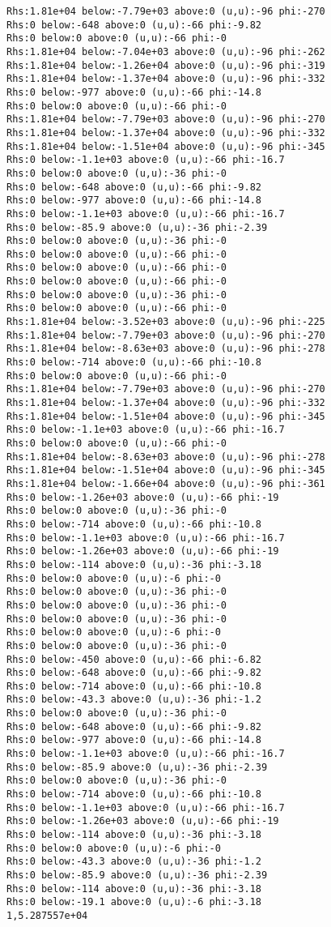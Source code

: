 \begin{verbatim}
Rhs:1.81e+04 below:-7.79e+03 above:0 (u,u):-96 phi:-270
Rhs:0 below:-648 above:0 (u,u):-66 phi:-9.82
Rhs:0 below:0 above:0 (u,u):-66 phi:-0
Rhs:1.81e+04 below:-7.04e+03 above:0 (u,u):-96 phi:-262
Rhs:1.81e+04 below:-1.26e+04 above:0 (u,u):-96 phi:-319
Rhs:1.81e+04 below:-1.37e+04 above:0 (u,u):-96 phi:-332
Rhs:0 below:-977 above:0 (u,u):-66 phi:-14.8
Rhs:0 below:0 above:0 (u,u):-66 phi:-0
Rhs:1.81e+04 below:-7.79e+03 above:0 (u,u):-96 phi:-270
Rhs:1.81e+04 below:-1.37e+04 above:0 (u,u):-96 phi:-332
Rhs:1.81e+04 below:-1.51e+04 above:0 (u,u):-96 phi:-345
Rhs:0 below:-1.1e+03 above:0 (u,u):-66 phi:-16.7
Rhs:0 below:0 above:0 (u,u):-36 phi:-0
Rhs:0 below:-648 above:0 (u,u):-66 phi:-9.82
Rhs:0 below:-977 above:0 (u,u):-66 phi:-14.8
Rhs:0 below:-1.1e+03 above:0 (u,u):-66 phi:-16.7
Rhs:0 below:-85.9 above:0 (u,u):-36 phi:-2.39
Rhs:0 below:0 above:0 (u,u):-36 phi:-0
Rhs:0 below:0 above:0 (u,u):-66 phi:-0
Rhs:0 below:0 above:0 (u,u):-66 phi:-0
Rhs:0 below:0 above:0 (u,u):-66 phi:-0
Rhs:0 below:0 above:0 (u,u):-36 phi:-0
Rhs:0 below:0 above:0 (u,u):-66 phi:-0
Rhs:1.81e+04 below:-3.52e+03 above:0 (u,u):-96 phi:-225
Rhs:1.81e+04 below:-7.79e+03 above:0 (u,u):-96 phi:-270
Rhs:1.81e+04 below:-8.63e+03 above:0 (u,u):-96 phi:-278
Rhs:0 below:-714 above:0 (u,u):-66 phi:-10.8
Rhs:0 below:0 above:0 (u,u):-66 phi:-0
Rhs:1.81e+04 below:-7.79e+03 above:0 (u,u):-96 phi:-270
Rhs:1.81e+04 below:-1.37e+04 above:0 (u,u):-96 phi:-332
Rhs:1.81e+04 below:-1.51e+04 above:0 (u,u):-96 phi:-345
Rhs:0 below:-1.1e+03 above:0 (u,u):-66 phi:-16.7
Rhs:0 below:0 above:0 (u,u):-66 phi:-0
Rhs:1.81e+04 below:-8.63e+03 above:0 (u,u):-96 phi:-278
Rhs:1.81e+04 below:-1.51e+04 above:0 (u,u):-96 phi:-345
Rhs:1.81e+04 below:-1.66e+04 above:0 (u,u):-96 phi:-361
Rhs:0 below:-1.26e+03 above:0 (u,u):-66 phi:-19
Rhs:0 below:0 above:0 (u,u):-36 phi:-0
Rhs:0 below:-714 above:0 (u,u):-66 phi:-10.8
Rhs:0 below:-1.1e+03 above:0 (u,u):-66 phi:-16.7
Rhs:0 below:-1.26e+03 above:0 (u,u):-66 phi:-19
Rhs:0 below:-114 above:0 (u,u):-36 phi:-3.18
Rhs:0 below:0 above:0 (u,u):-6 phi:-0
Rhs:0 below:0 above:0 (u,u):-36 phi:-0
Rhs:0 below:0 above:0 (u,u):-36 phi:-0
Rhs:0 below:0 above:0 (u,u):-36 phi:-0
Rhs:0 below:0 above:0 (u,u):-6 phi:-0
Rhs:0 below:0 above:0 (u,u):-36 phi:-0
Rhs:0 below:-450 above:0 (u,u):-66 phi:-6.82
Rhs:0 below:-648 above:0 (u,u):-66 phi:-9.82
Rhs:0 below:-714 above:0 (u,u):-66 phi:-10.8
Rhs:0 below:-43.3 above:0 (u,u):-36 phi:-1.2
Rhs:0 below:0 above:0 (u,u):-36 phi:-0
Rhs:0 below:-648 above:0 (u,u):-66 phi:-9.82
Rhs:0 below:-977 above:0 (u,u):-66 phi:-14.8
Rhs:0 below:-1.1e+03 above:0 (u,u):-66 phi:-16.7
Rhs:0 below:-85.9 above:0 (u,u):-36 phi:-2.39
Rhs:0 below:0 above:0 (u,u):-36 phi:-0
Rhs:0 below:-714 above:0 (u,u):-66 phi:-10.8
Rhs:0 below:-1.1e+03 above:0 (u,u):-66 phi:-16.7
Rhs:0 below:-1.26e+03 above:0 (u,u):-66 phi:-19
Rhs:0 below:-114 above:0 (u,u):-36 phi:-3.18
Rhs:0 below:0 above:0 (u,u):-6 phi:-0
Rhs:0 below:-43.3 above:0 (u,u):-36 phi:-1.2
Rhs:0 below:-85.9 above:0 (u,u):-36 phi:-2.39
Rhs:0 below:-114 above:0 (u,u):-36 phi:-3.18
Rhs:0 below:-19.1 above:0 (u,u):-6 phi:-3.18
1,5.287557e+04
\end{verbatim}